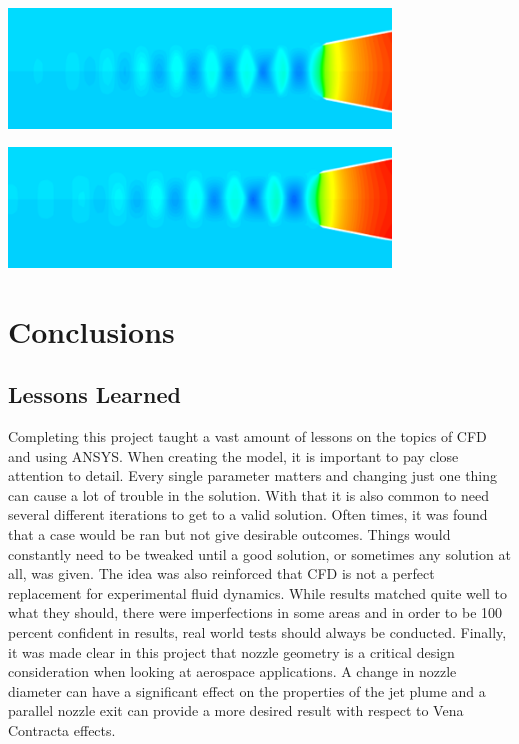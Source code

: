 \documentclass[12pt]{article} %
\begin{document}
\begin{center}
    \includegraphics[width=4in]{Pressure_Air.png}
    \label{fig:pressure_air}
\end{center}

\begin{center}
    \includegraphics[width=4in]{Pressure_CO2.png}
    \label{fig:pressure_CO2}
\end{center}

\section{Conclusions}
\subsection{Lessons Learned}
Completing this project taught a vast amount of lessons on the topics of CFD and using ANSYS. When creating the model, it is important to pay close attention to detail. Every single parameter matters and changing just one thing can cause a lot of trouble in the solution. With that it is also common to need several different iterations to get to a valid solution. Often times, it was found that a case would be ran but not give desirable outcomes. Things would constantly need to be tweaked until a good solution, or sometimes any solution at all, was given. The idea was also reinforced that CFD is not a perfect replacement for experimental fluid dynamics. While results matched quite well to what they should, there were imperfections in some areas and in order to be 100 percent confident in results, real world tests should always be conducted. Finally, it was made clear in this project that nozzle geometry is a critical design consideration when looking at aerospace applications. A change in nozzle diameter can have a significant effect on the properties of the jet plume and a parallel nozzle exit can provide a more desired result with respect to Vena Contracta effects.
\end{document}
